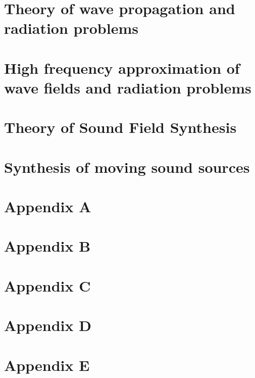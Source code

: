 \documentclass[%
	paper=A4,					%
	twoside=true,				%
	openright,					%
	chapterprefix=true,			%
	11pt,						%
	headings=normal,			%
	bibliography=totoc,			%
	listof=totoc,				%
	titlepage=on,				%
	captions=tableabove,		%
	draft=false,				%
]{scrreprt}
\begin{document}


\pagestyle{empty}				%
\cleardoublepage

\pagestyle{plain}				%
\setcounter{tocdepth}{2}		%
\tableofcontents				%
\cleardoublepage
{}			%
\setcounter{page}{1}			%
\pagestyle{maincontentstyle} 	%

%
\chapter{Theory of wave propagation and radiation problems}
\label{sec:general_wave_theory}



\chapter{High frequency approximation of wave fields and radiation problems}
\label{sec:high_freq_approx}



\chapter{Theory of Sound Field Synthesis}
\label{sec:sound_field_synthesis}


\chapter{Synthesis of moving sound sources}
\label{sec:moving_source_synthesis}

%
%
\begin{appendices}
\chapter{Appendix A}

\chapter{Appendix B}

\chapter{Appendix C}

\chapter{Appendix D}

\chapter{Appendix E}

\end{appendices} 

\cleardoublepage
{%
\renewcommand{\bibfont}{\normalfont\small}
\setlength{\biblabelsep}{0pt}
\setlength{\bibitemsep}{0.5\baselineskip plus 0.5\baselineskip}
\printbibliography
} 
\end{document}
